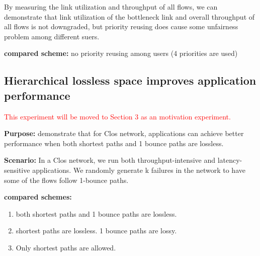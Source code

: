 By measuring the link utilization and throughput of all flows, we can demonstrate that link utilization of the bottleneck link and overall throughput of all flows is not downgraded, but priority reusing does cause some unfairness problem among different suers.

\textbf{compared scheme:} no priority reusing among users (4 priorities are used)
  
\subsection{Hierarchical lossless space improves application performance}\label{subsec:exp_appperformance}

\textcolor{red}{This experiment will be moved to Section 3 as an motivation experiment.}

\textbf{Purpose:} demonstrate that for Clos network, applications can achieve better performance when both shortest paths and 1 bounce paths are lossless.

\textbf{Scenario:} In a Clos network, we run both throughput-intensive and latency-sensitive applications. We randomly generate k failures in the network to have some of the flows follow 1-bounce paths.

 \textbf{compared schemes:}
 \begin{enumerate}
 	\item both shortest paths and  1 bounce paths are lossless.
 	\item shortest paths are lossless. 1 bounce paths are lossy.
 	\item Only shortest paths are allowed.
 \end{enumerate}
  
%   
%   
    
    
  